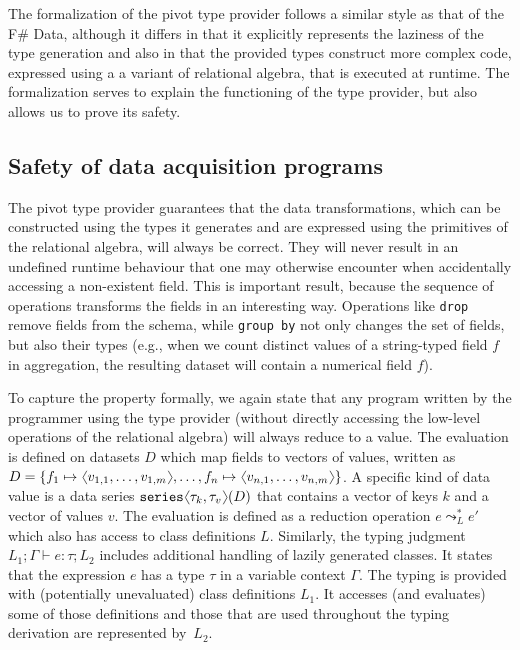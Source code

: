 \documentclass[fleqn,11pt]{report}
\newcommand{\ident}[1]{\textnormal{\ttfamily #1}}
\newcommand{\langl}{\begin{picture}(4.5,7)
\put(1.1,2.5){\rotatebox{60}{\line(1,0){5.5}}}
\put(1.1,2.5){\rotatebox{300}{\line(1,0){5.5}}}
\end{picture}}
\newcommand{\rangl}{\begin{picture}(4.5,7)
\put(.9,2.5){\rotatebox{120}{\line(1,0){5.5}}}
\put(.9,2.5){\rotatebox{240}{\line(1,0){5.5}}}
\end{picture}}
\newcommand{\vect}[1]{\langl #1 \rangl}
\theoremstyle{definition}
\begin{document}
The formalization of the pivot type provider follows a similar style as that of the F\# Data,
although it differs in that it explicitly represents the laziness of the type generation and
also in that the provided types construct more complex code, expressed using a a variant of
relational algebra, that is executed at runtime. The formalization serves to explain the functioning
of the type provider, but also allows us to prove its safety.

\subsection{Safety of data acquisition programs}

The pivot type provider guarantees that the data transformations, which can be constructed using
the types it generates and are expressed using the primitives of the relational algebra, will
always be correct. They will never result in an undefined runtime behaviour that one may otherwise
encounter when accidentally accessing a non-existent field. This is important result, because the
sequence of operations transforms the fields in an interesting way. Operations like \texttt{drop}
remove fields from the schema, while \texttt{group by} not only changes the set of fields, but also
their types (e.g., when we count distinct values of a string-typed field $f$ in aggregation,
the resulting dataset will contain a numerical field $f$).

To capture the property formally, we again state that any program written by the programmer using
the type provider (without directly accessing the low-level operations of the relational algebra)
will always reduce to a value. The evaluation is defined on datasets $D$ which
map fields to vectors of values, written as $D =
\{ f_1\mapsto\vect{v_{1,1},\ldots,v_{1,m}}, \ldots, f_n\mapsto\vect{v_{n,1},\ldots,v_{n,m}} \}$.
A specific kind of data value is a data series $\ident{series}\langl\tau_k,\tau_v\rangl(D)$ that
contains a vector of keys $k$ and a vector of values $v$. The evaluation is defined as a reduction
operation $e \leadsto_{L}^{*} e'$ which also has access to class definitions $L$.
Similarly, the typing judgment $L_1;\Gamma \vdash e : \tau; L_2$ includes additional handling of
lazily generated classes. It states that the expression $e$ has a type $\tau$ in a variable context
$\Gamma$. The typing is provided with (potentially unevaluated) class definitions $L_1$. It
accesses (and evaluates) some of those definitions and those that are used throughout the typing
derivation are represented by~$L_2$.
\end{document}
